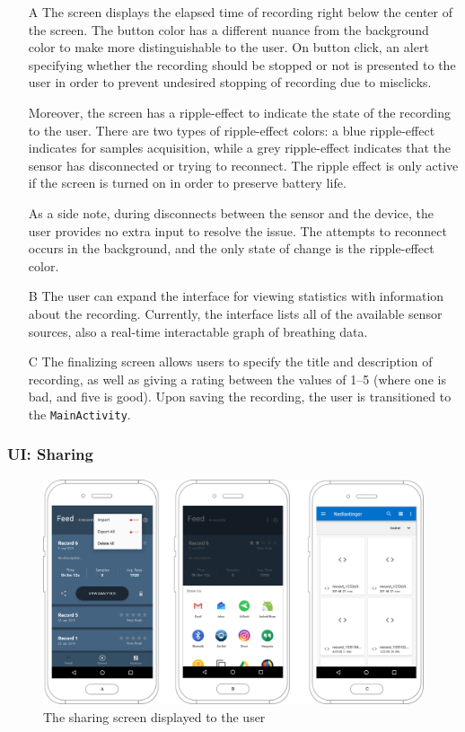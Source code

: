 \begin{itemize}
    \item[A] The screen displays the elapsed time of recording right below the center of the screen. The button color has a different nuance from the background color to make more distinguishable to the user. On button click, an alert specifying whether the recording should be stopped or not is presented to the user in order to prevent undesired stopping of recording due to misclicks. 
    
    Moreover, the screen has a ripple-effect to indicate the state of the recording to the user. There are two types of ripple-effect colors: a blue ripple-effect indicates for samples acquisition, while a grey ripple-effect indicates that the sensor has disconnected or trying to reconnect. The ripple effect is only active if the screen is turned on in order to preserve battery life. 
    
    As a side note, during disconnects between the sensor and the device, the user provides no extra input to resolve the issue. The attempts to reconnect occurs in the background, and the only state of change is the ripple-effect color. 
    \item[B] The user can expand the interface for viewing statistics with information about the recording. Currently, the interface lists all of the available sensor sources, also a real-time interactable graph of breathing data.
    \item[C] The finalizing screen allows users to specify the title and description of recording, as well as giving a rating between the values of 1--5 (where one is bad, and five is good). Upon saving the recording, the user is transitioned to the \verb|MainActivity|.

\end{itemize}

\subsubsection{UI: Sharing}
\begin{figure}[!h]
    \centering
    \includegraphics[scale=0.26]{images/Sharing_img.pdf}
    \caption{The sharing screen displayed to the user}
    \label{fig:screen_sharing}
\end{figure}


